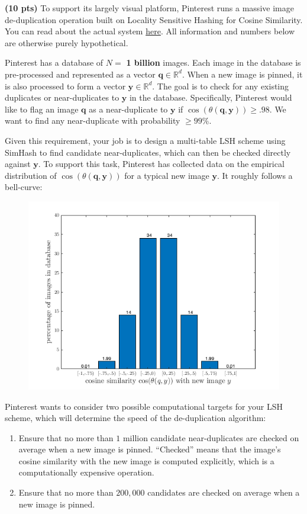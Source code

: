 \documentclass[10pt]{article}
\newcommand{\bv}[1]{\mathbf{#1}}
\newcommand{\R}{\mathbb{R}}
\begin{document}
\noindent\textbf{(10 pts)}
To support its largely visual platform, Pinterest runs a massive image de-duplication operation built on Locality Sensitive Hashing for Cosine Similarity. You can read about the actual system \href{https://medium.com/pinterest-engineering/detecting-image-similarity-using-spark-lsh-and-tensorflow-618636afc939}{here}. All information and numbers below are otherwise purely hypothetical.

Pinterest has a database of $N = $ \textbf{1 billion} images. Each image in the database is pre-processed and represented as a vector $\bv{q}\in \R^d$. When a new image is pinned, it is also processed to form a vector $\bv{y} \in \R^d$. The goal is to check for any existing duplicates or near-duplicates to $\bv{y}$ in the database.  
Specifically, Pinterest would like to flag an image $\bv{q}$ as a near-duplicate to $\bv{y}$ if $\cos(\theta(\bv{q},\bv{y})) \geq .98$. We want to find any near-duplicate with probability $\geq 99\%$. 

Given this requirement, your job is to design a multi-table LSH scheme using SimHash to find candidate near-duplicates, which can then be checked directly against $\bv{y}$. To support this task, Pinterest has collected data on the empirical distribution of $\cos(\theta(\bv{q},\bv{y}))$ for a typical new image $\bv{y}$. It roughly follows a bell-curve:

\begin{figure}[H]
	\centering
	\includegraphics[width=.6\textwidth]{dist.png}
\end{figure} 

Pinterest wants to consider two possible computational targets for your LSH scheme, which will determine the speed of the de-duplication algorithm:
\begin{enumerate}
	\item Ensure that no more than $1$ million candidate near-duplicates are checked on average when a new image is pinned. ``Checked'' means that the image's cosine similarity with the new image is computed explicitly, which is a computationally expensive operation.
	\item Ensure that no more than $200,000$ candidates are checked on average when a new image is pinned.
\end{enumerate}
\end{document}
